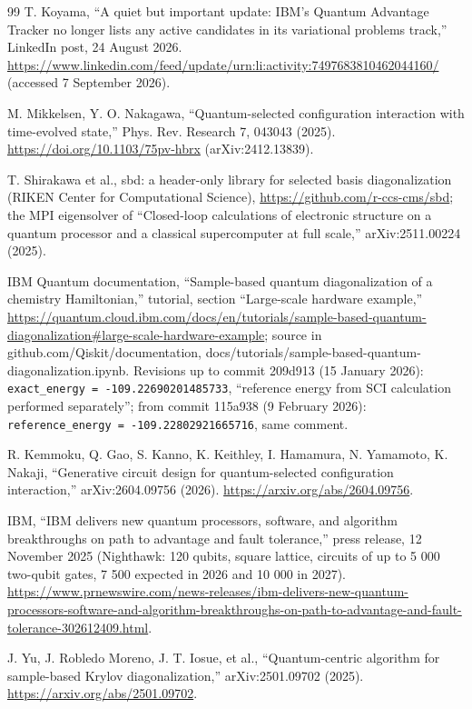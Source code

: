 \documentclass[11pt]{article}
\begin{document}
\begin{thebibliography}{99}
T. Koyama, ``A quiet but important update: IBM's Quantum Advantage Tracker no longer lists any active candidates in its variational problems track,'' LinkedIn post, 24 August 2026. \url{https://www.linkedin.com/feed/update/urn:li:activity:7497683810462044160/} (accessed 7 September 2026).

M. Mikkelsen, Y. O. Nakagawa, ``Quantum-selected configuration interaction with time-evolved state,'' Phys. Rev. Research 7, 043043 (2025). \url{https://doi.org/10.1103/75pv-hbrx} (arXiv:2412.13839).

T. Shirakawa et al., sbd: a header-only library for selected basis diagonalization (RIKEN Center for Computational Science), \url{https://github.com/r-ccs-cms/sbd}; the MPI eigensolver of ``Closed-loop calculations of electronic structure on a quantum processor and a classical supercomputer at full scale,'' arXiv:2511.00224 (2025).

IBM Quantum documentation, ``Sample-based quantum diagonalization of a chemistry Hamiltonian,'' tutorial, section ``Large-scale hardware example,'' \url{https://quantum.cloud.ibm.com/docs/en/tutorials/sample-based-quantum-diagonalization#large-scale-hardware-example}; source in github.com/Qiskit/documentation, docs/tutorials/sample-based-quantum-diagonalization.ipynb. Revisions up to commit 209d913 (15 January 2026): \texttt{exact\_energy = -109.22690201485733}, ``reference energy from SCI calculation performed separately''; from commit 115a938 (9 February 2026): \texttt{reference\_energy = -109.22802921665716}, same comment.

R. Kemmoku, Q. Gao, S. Kanno, K. Keithley, I. Hamamura, N. Yamamoto, K. Nakaji, ``Generative circuit design for quantum-selected configuration interaction,'' arXiv:2604.09756 (2026). \url{https://arxiv.org/abs/2604.09756}.

IBM, ``IBM delivers new quantum processors, software, and algorithm breakthroughs on path to advantage and fault tolerance,'' press release, 12 November 2025 (Nighthawk: 120 qubits, square lattice, circuits of up to 5 000 two-qubit gates, 7 500 expected in 2026 and 10 000 in 2027). \url{https://www.prnewswire.com/news-releases/ibm-delivers-new-quantum-processors-software-and-algorithm-breakthroughs-on-path-to-advantage-and-fault-tolerance-302612409.html}.

J. Yu, J. Robledo Moreno, J. T. Iosue, et al., ``Quantum-centric algorithm for sample-based Krylov diagonalization,'' arXiv:2501.09702 (2025). \url{https://arxiv.org/abs/2501.09702}.


\end{thebibliography}
\end{document}
